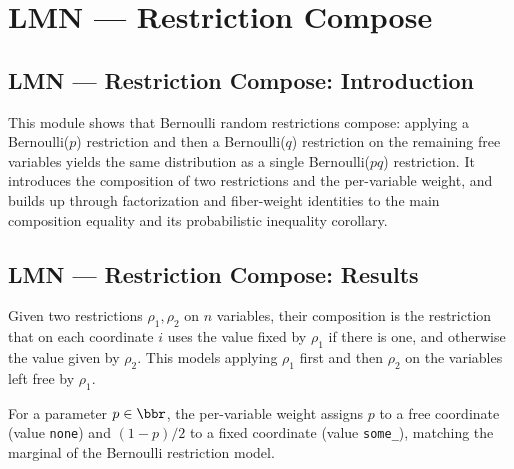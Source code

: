 \section{LMN --- Restriction Compose}
\subsection*{LMN --- Restriction Compose: Introduction}

This module shows that Bernoulli random restrictions compose: applying a
Bernoulli($p$) restriction and then a Bernoulli($q$) restriction on the remaining
free variables yields the same distribution as a single Bernoulli($pq$) restriction.
It introduces the composition of two restrictions and the per-variable weight, and
builds up through factorization and fiber-weight identities to the main composition
equality and its probabilistic inequality corollary.

\subsection*{LMN --- Restriction Compose: Results}

\begin{definition}
\label{LMN.composeRestr}
\leanok
{}
Given two restrictions $\rho_1, \rho_2$ on $n$ variables, their composition is the
restriction that on each coordinate $i$ uses the value fixed by $\rho_1$ if there is
one, and otherwise the value given by $\rho_2$. This models applying $\rho_1$ first
and then $\rho_2$ on the variables left free by $\rho_1$.
\end{definition}

\begin{definition}
\label{LMN.varWeight}
\leanok
For a parameter $p \in \bbr$, the per-variable weight assigns $p$ to a free
coordinate (value \texttt{none}) and $(1-p)/2$ to a fixed coordinate (value
\texttt{some\_}), matching the marginal of the Bernoulli restriction model.
\end{definition}

